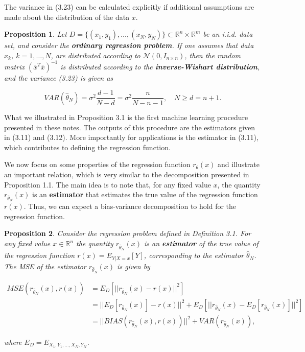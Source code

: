 \documentclass{report}
\newtheorem{proposition}{Proposition}[chapter]
\begin{document}
The variance in (3.23) can be calculated explicitly if additional assumptions are made about the distribution of the data $x$.

\begin{proposition}
Let $D = \{(x_1,y_1),\dots,(x_N,y_N)\} \subset \mathbb{R}^n \times \mathbb{R}^m$ be an i.i.d. data set, and consider the \textbf{ordinary regression problem}. If one assumes that data $x_k$, $k = 1, \dots, N$, are distributed according to $\mathcal{N}(0, I_{n\times n})$, then the random matrix $(\bar{x}^T\bar{x})^{-1}$ is distributed according to the \textbf{inverse-Wishart distribution}, and the variance (3.23) is given as

\begin{equation}
VAR(\hat{\theta}_N) = \sigma^2\frac{d - 1}{N - d} = \sigma^2\frac{n}{N - n - 1}, \quad  N \geq d = n + 1.
\end{equation}
\end{proposition}

What we illustrated in Proposition 3.1 is the first machine learning procedure presented in these notes. The outputs of this procedure are the estimators given in (3.11) and (3.12). More importantly for applications is the estimator in (3.11), which contributes to defining the regression function.

We now focus on some properties of the regression function $r_\theta(x)$ and illustrate an important relation, which is very similar to the decomposition presented in Proposition 1.1. The main idea is to note that, for any fixed value $x$, the quantity $r_{\hat{\theta}_N}(x)$ is an \textbf{estimator} that estimates the true value of the regression function $r(x)$. Thus, we can expect a bias-variance decomposition to hold for the regression function.

\begin{proposition}
Consider the regression problem defined in Definition 3.1. For any fixed value $x \in \mathbb{R}^n$ the quantity $r_{\hat{\theta}_N}(x)$ is an \textbf{estimator} of the true value of the regression function $r(x) = E_{Y|X = x}[Y]$, corresponding to the estimator $\hat{\theta}_N$. The MSE of the estimator $r_{\hat{\theta}_N}(x)$ is given by

\begin{equation}
\begin{split}
MSE(r_{\hat{\theta}_N}(x),r(x)) &= E_D[||r_{\hat{\theta}_N}(x) - r(x)||^2] \\
&=||E_D[r_{\hat{\theta}_N}(x)] - r(x)||^2+E_D[||r_{\hat{\theta}_N}(x) - E_D[r_{\hat{\theta}_N}(x)]||^2]\\
&=||BIAS(r_{\hat{\theta}_N}(x), r(x))||^2 + VAR(r_{\hat{\theta}_N}(x)),
\end{split}
\end{equation}

where $E_D = E_{X_1,Y_1,\dots,X_N,Y_N}$.
\end{proposition}
\end{document}
